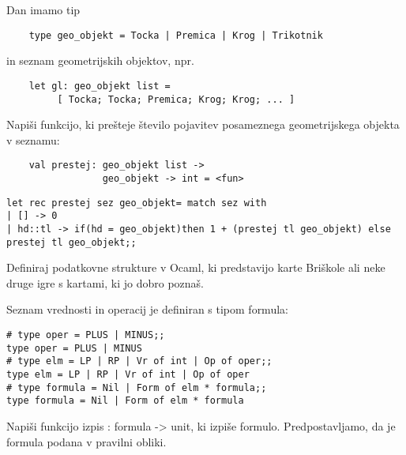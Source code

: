 \begin{ex}
Dan imamo tip 

\begin{verbatim}
	type geo_objekt = Tocka | Premica | Krog | Trikotnik 
\end{verbatim}
in seznam geometrijskih objektov, npr.

\begin{verbatim}
	let gl: geo_objekt list = 
         [ Tocka; Tocka; Premica; Krog; Krog; ... ] 
\end{verbatim}

Napi\v si funkcijo, ki pre\v steje \v stevilo pojavitev posameznega geometrijskega objekta v seznamu:

\begin{verbatim}
	val prestej: geo_objekt list -> 
                 geo_objekt -> int = <fun>
\end{verbatim}

\begin{sol}
\begin{verbatim}
let rec prestej sez geo_objekt= match sez with
| [] -> 0
| hd::tl -> if(hd = geo_objekt)then 1 + (prestej tl geo_objekt) else prestej tl geo_objekt;;
\end{verbatim}
\end{sol}

\end{ex}
\begin{ex}
Definiraj podatkovne strukture v Ocaml, ki predstavijo karte Bri\v skole ali neke druge igre s kartami, ki jo dobro pozna\v s.



\end{ex}
\begin{ex}
Seznam vrednosti in operacij je definiran s tipom formula: 
\begin{verbatim}
# type oper = PLUS | MINUS;; 
type oper = PLUS | MINUS 
# type elm = LP | RP | Vr of int | Op of oper;; 
type elm = LP | RP | Vr of int | Op of oper 
# type formula = Nil | Form of elm * formula;; 
type formula = Nil | Form of elm * formula 
\end{verbatim}


Napi\v si funkcijo izpis : formula -> unit, ki izpi\v se formulo. Predpostavljamo, da je formula podana v pravilni obliki.



\end{ex}
